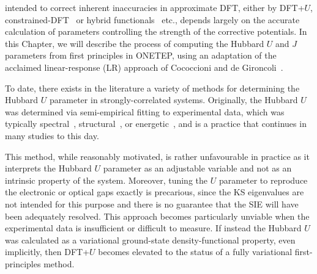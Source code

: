 
 intended to 
correct inherent inaccuracies in approximate DFT, 
either by DFT+$U$, 
constrained-DFT~\cite{PhysRevLett.53.2512,Sit2007107,doi10.1021/cr200148b} 
or hybrid functionals~\cite{doi:10.1063/1.464304,PhysRevB.94.035140} etc., 
depends largely on the accurate calculation 
of parameters controlling the strength 
of the corrective potentials.
%
%
In this Chapter, 
we will describe 
the process of computing the Hubbard $U$ and $J$ 
parameters from first principles in {\sc ONETEP}, 
using an adaptation of 
the acclaimed linear-response (LR) approach 
of Cococcioni and de Gironcoli~\cite{PhysRevB.71.035105,PhysRevB.84.115108}.

To date, there exists in the literature 
a variety of methods for determining 
the Hubbard $U$ parameter 
in strongly-correlated systems.
%
Originally, 
the Hubbard $U$ was determined via 
semi-empirical fitting to experimental data, 
which was
typically spectral~\cite{HERZBERG1972425,PhysRevB.70.125426,:/content/aip/journal/jcp/127/24/10.1063/1.2800015,Morgan20075034}, 
structural~\cite{PhysRevB.70.125426,PhysRevB.75.035115,:/content/aip/journal/jcp/127/24/10.1063/1.2800015}, 
or energetic~\cite{PhysRevB.73.195107,C1EE01782A}, 
and is a practice that continues in many studies to this day.

This method, 
while reasonably motivated, 
is rather unfavourable in practice 
as it interprets the Hubbard $U$ parameter 
as an adjustable variable 
and not as an intrinsic property of the system.
%
{
Moreover, 
tuning the $U$ parameter to reproduce 
the electronic or optical gaps exactly is precarious, 
since the KS eigenvalues are not intended for this purpose 
and there is no guarantee that the SIE 
will have been adequately resolved.}
%
This approach becomes particularly unviable when 
the experimental data is insufficient  
or difficult to measure.
%
If instead the Hubbard $U$ was calculated as a 
variational ground-state density-functional property, even implicitly, 
then DFT+$U$ becomes elevated 
to the status of a fully variational first-principles method. 
%

